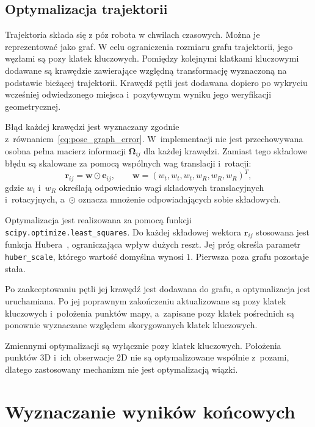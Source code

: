 \subsection{Optymalizacja trajektorii}
\label{subsec:optymalizacja_grafu_implementacja}

Trajektoria składa się z póz robota w chwilach czasowych. Można je reprezentować jako graf. W celu ograniczenia rozmiaru grafu trajektorii, jego węzłami są pozy klatek kluczowych. Pomiędzy kolejnymi klatkami kluczowymi dodawane są krawędzie zawierające względną transformację wyznaczoną na podstawie bieżącej trajektorii. Krawędź pętli jest dodawana dopiero po wykryciu wcześniej odwiedzonego miejsca i~pozytywnym wyniku jego weryfikacji geometrycznej.

Błąd każdej krawędzi jest wyznaczany zgodnie z~równaniem~\eqref{eq:pose_graph_error}. W~implementacji nie jest przechowywana osobna pełna macierz informacji $\boldsymbol{\Omega}_{ij}$ dla każdej krawędzi. Zamiast tego składowe błędu są skalowane za pomocą wspólnych wag translacji i~rotacji:
\begin{equation}
    \mathbf{r}_{ij}
    =
    \mathbf{w}\odot\mathbf{e}_{ij},
    \qquad
    \mathbf{w}
    =
    (w_t,w_t,w_t,w_R,w_R,w_R)^T,
    \label{eq:implementation_pose_graph_residual}
\end{equation}
gdzie $w_t$ i~$w_R$ określają odpowiednio wagi składowych translacyjnych i~rotacyjnych, a~$\odot$ oznacza mnożenie odpowiadających sobie składowych.

Optymalizacja jest realizowana za pomocą funkcji \texttt{scipy.optimize.least\_squares}. Do każdej składowej wektora $\mathbf{r}_{ij}$ stosowana jest funkcja Hubera~\cite{huber1964robust}, ograniczająca wpływ dużych reszt. Jej próg określa parametr \texttt{huber\_scale}, którego wartość domyślna wynosi $1$. Pierwsza poza grafu pozostaje stała.

Po zaakceptowaniu pętli jej krawędź jest dodawana do grafu, a optymalizacja jest uruchamiana. Po jej poprawnym zakończeniu aktualizowane są pozy klatek kluczowych i~położenia punktów mapy, a~zapisane pozy klatek pośrednich są ponownie wyznaczane względem skorygowanych klatek kluczowych.

Zmiennymi optymalizacji są wyłącznie pozy klatek kluczowych. Położenia punktów 3D i~ich obserwacje 2D nie są optymalizowane wspólnie z~pozami, dlatego zastosowany mechanizm nie jest optymalizacją wiązki.

\section{Wyznaczanie wyników końcowych}
\label{sec:implementacja_wyjscia}

